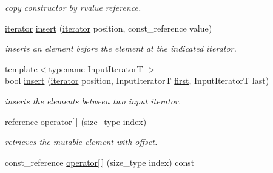\begin{DoxyCompactItemize}
\begin{DoxyCompactList}\small\item\em copy constructor by rvalue reference. \end{DoxyCompactList}\item 
\hypertarget{classhryky_1_1_fixed_vector_a8fb930253e5023e26863dbb41be7a955}{\hyperlink{classhryky_1_1iterator_1_1random_1_1_mutable}{iterator} \hyperlink{classhryky_1_1_fixed_vector_a8fb930253e5023e26863dbb41be7a955}{insert} (\hyperlink{classhryky_1_1iterator_1_1random_1_1_mutable}{iterator} position, const\-\_\-reference value)}\label{classhryky_1_1_fixed_vector_a8fb930253e5023e26863dbb41be7a955}

\begin{DoxyCompactList}\small\item\em inserts an element before the element at the indicated iterator. \end{DoxyCompactList}\item 
\hypertarget{classhryky_1_1_fixed_vector_a63f5ed5e699bd6f5b0c068bb19e34ec4}{{\footnotesize template$<$typename Input\-Iterator\-T $>$ }\\bool \hyperlink{classhryky_1_1_fixed_vector_a63f5ed5e699bd6f5b0c068bb19e34ec4}{insert} (\hyperlink{classhryky_1_1iterator_1_1random_1_1_mutable}{iterator} position, Input\-Iterator\-T \hyperlink{classhryky_1_1_fixed_vector_a1133d189d2a155830e739d20450e1b40}{first}, Input\-Iterator\-T last)}\label{classhryky_1_1_fixed_vector_a63f5ed5e699bd6f5b0c068bb19e34ec4}

\begin{DoxyCompactList}\small\item\em inserts the elements between two input iterator. \end{DoxyCompactList}\item 
\hypertarget{classhryky_1_1_fixed_vector_a90e3657bfbfb55f47cacfa25cf11a36c}{reference \hyperlink{classhryky_1_1_fixed_vector_a90e3657bfbfb55f47cacfa25cf11a36c}{operator\mbox{[}$\,$\mbox{]}} (size\-\_\-type index)}\label{classhryky_1_1_fixed_vector_a90e3657bfbfb55f47cacfa25cf11a36c}

\begin{DoxyCompactList}\small\item\em retrieves the mutable element with offset. \end{DoxyCompactList}\item 
\hypertarget{classhryky_1_1_fixed_vector_ab0e74c2e03415fa8536dfd9ebc54934e}{const\-\_\-reference \hyperlink{classhryky_1_1_fixed_vector_ab0e74c2e03415fa8536dfd9ebc54934e}{operator\mbox{[}$\,$\mbox{]}} (size\-\_\-type index) const }\label{classhryky_1_1_fixed_vector_ab0e74c2e03415fa8536dfd9ebc54934e}


\end{DoxyCompactItemize}
